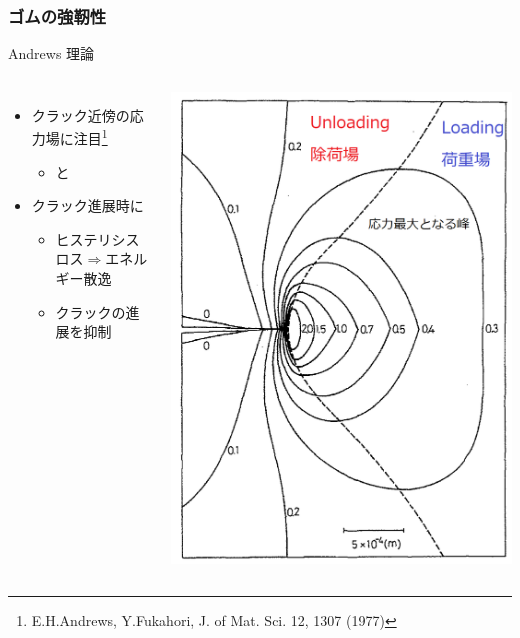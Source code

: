 \documentclass[12pt, dvipdfmx]{beamer}
\begin{document}
\begin{frame}
	\frametitle{ゴムの強靭性}
		\begin{exampleblock}{Andrews 理論}
			\begin{columns}[T, onlytextwidth]
				\begin{itemize}
					\item クラック近傍の応力場に注目\footnote{
						\scriptsize
			{E.H.Andrews, Y.Fukahori, J. of Mat. Sci. 12, 1307 (1977)}
					}
						\begin{itemize}
							\item \color{blue}{Loading 場}と \color{red}{Unloading 場}
						\end{itemize}
					\item クラック進展時に\color{green}{応力場が遷移}
						\begin{itemize}
							\item ヒステリシスロス$\Rightarrow${エネルギー散逸}
							\item クラックの進展を\alert{抑制}
						\end{itemize}
				\end{itemize}
					\begin{center}
						\includegraphics[width=.85\textwidth]{crack.png}

\end{center}
\end{columns}
\end{exampleblock}
\end{frame}
\end{document}
